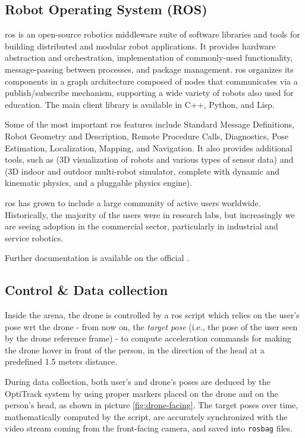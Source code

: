 \subsection{Robot Operating System (ROS)}
\label{subsec:ROS}

\gls{ros} is an open-source robotics middleware suite of software libraries and tools for building distributed and modular robot applications. It provides hardware abstraction and orchestration, implementation of commonly-used functionality, message-passing between processes, and package management. \gls{ros} organizes its components in a graph architecture composed of nodes that communicates via a publish/subscribe mechanism, supporting a wide variety of robots also used for education. The main client library is available in C++, Python, and Lisp.

Some of the most important \gls{ros} features include Standard Message Definitions, Robot Geometry and Description, Remote Procedure Calls, Diagnostics, Pose Estimation, Localization, Mapping, and Navigation. It also provides additional tools, such as \cite{rviz} (3D visualization of robots and various types of sensor data) and \cite{Gazebo} (3D indoor and outdoor multi-robot simulator, complete with dynamic and kinematic physics, and a pluggable physics engine).

\medskip

\gls{ros} has grown to include a large community of active users worldwide. Historically, the majority of the users were in research labs, but increasingly we are seeing adoption in the commercial sector, particularly in industrial and service robotics.

Further documentation is available on the official \cite{ROS}.



\subsection{Control \& Data collection}
\label{subsec:control}

Inside the arena, the drone is controlled by a \gls{ros} script which relies on the user's pose \gls{wrt} the drone - from now on, the \textit{target pose} (i.e., the pose of the user seen by the drone reference frame) - to compute acceleration commands for making the drone hover in front of the person, in the direction of the head at a predefined 1.5 meters distance. 

\medskip

During data collection, both user's and drone's poses are deduced by the OptiTrack system by using proper markers placed on the drone and on the person's head, as shown in picture \ref{fig:drone-facing}. The target poses over time, mathematically computed by the script, are accurately synchronized with the video stream coming from the front-facing camera, and saved into \texttt{rosbag} files.

